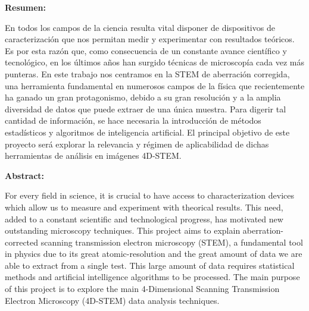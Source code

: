 
\newpage
\thispagestyle{empty} %

{\bfseries \large Resumen:} \vspace{5mm}

En todos los campos de la ciencia resulta vital disponer de dispositivos de caracterización que nos permitan medir y experimentar con resultados teóricos. Es por esta razón que, como consecuencia de un constante avance científico y tecnológico, en los últimos años han surgido técnicas de microscopía cada vez más punteras. En este trabajo nos centramos en la STEM de aberración corregida, una herramienta fundamental en numerosos campos de la física que recientemente ha ganado un gran protagonismo, debido a su gran resolución y a la amplia diversidad de datos que puede extraer de una única muestra. Para digerir tal cantidad de información, se hace necesaria la introducción de métodos estadísticos y algoritmos de inteligencia artificial. El principal objetivo de este proyecto será explorar la relevancia y régimen de aplicabilidad de dichas herramientas de análisis en imágenes 4D-STEM.

\vspace{1cm}

{\bfseries \large Abstract: }\vspace{5mm} 

For every field in science, it is crucial to have access to characterization devices  which allow us to measure and experiment with theorical results.  This need, added to a constant scientific and technological progress, has motivated new outstanding microscopy techniques. This project aims to explain aberration-corrected scanning transmission electron microscopy (STEM), a fundamental tool in physics due to its great atomic-resolution and the great amount of data we are able to extract from a single test. This large amount of data requires statistical methods and artificial intelligence algorithms to be processed. The main purpose of this project is to explore the main 4-Dimensional Scanning Transmission Electron Microscopy (4D-STEM) data analysis techniques.

\vspace{1cm}

